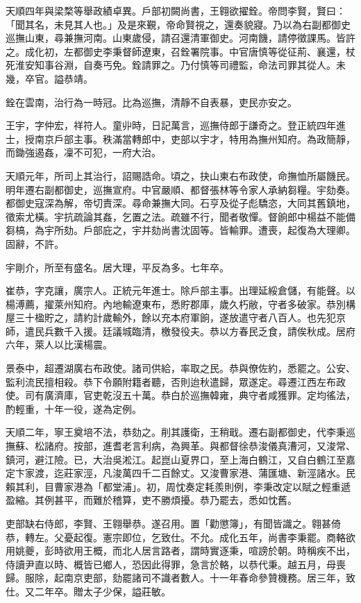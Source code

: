 \begin{pinyinscope}
天順四年與梁楘等舉政績卓異。戶部初闕尚書，王翱欲擢銓。帝問李賢，賢曰：「聞其名，未見其人也。」及是來覲，帝命賢視之，還奏貌寢。乃以為右副都御史巡撫山東，尋兼撫河南。山東歲侵，請召還清軍御史。河南饑，請停徵課馬。皆許之。成化初，左都御史李秉督師遼東，召銓署院事。中官唐慎等從征荊、襄還，杖死淮安知事谷淵，自奏丐免。銓請罪之。乃付慎等司禮監，命法司罪其從人。未幾，卒官。謚恭靖。

銓在雲南，治行為一時冠。比為巡撫，清靜不自表暴，吏民亦安之。

王宇，字仲宏，祥符人。童丱時，日記萬言，巡撫侍郎于謙奇之。登正統四年進士，授南京戶部主事。秩滿當轉郎中，吏部以宇才，特用為撫州知府。為政簡靜，而鋤強遏姦，凜不可犯，一府大治。

天順元年，所司上其治行，詔賜誥命。頃之，抉山東右布政使，命撫恤所屬饑民。明年遷右副都御史，巡撫宣府。中官嚴順、都督張林等令家人承納芻糧。宇劾奏。都御史寇深為解，帝切責深。尋命兼撫大同。石亨及從子彪驕恣，大同其舊鎮地，徵索尤橫。宇抗疏論其姦，乞置之法。疏雖不行，聞者敬憚。督餉郎中楊益不能備芻槁，為宇所劾。戶部庇之，宇并劾尚書沈固等。皆輸罪。遭喪，起復為大理卿。固辭，不許。

宇剛介，所至有盛名。居大理，平反為多。七年卒。

崔恭，字克讓，廣宗人。正統元年進士。除戶部主事。出理延綏倉儲，有能聲。以楊溥薦，擢萊州知府。內地輸遼東布，悉貯郡庫，歲久朽敝，守者多破家。恭別構屋三十楹貯之，請約計歲輸外，餘以充本府軍餉，遂放遣守者八百人。也先犯京師，遣民兵數千入援。廷議城臨清，檄發役夫。恭以方春民乏食，請俟秋成。居府六年，萊人以比漢楊震。

景泰中，超遷湖廣右布政使。諸司供給，率取之民。恭與僚佐約，悉罷之。公安、監利流民擅相殺。恭下令願附籍者聽，否則迨秋遣歸，眾遂定。尋遷江西左布政使。司有廣濟庫，官吏乾沒五十萬。恭白於巡撫韓雍，典守者咸獲罪。定均徭法，酌輕重，十年一役，遂為定例。

天順二年，寧王奠培不法，恭劾之。削其護衛，王稍戢。遷右副都御史，代李秉巡撫蘇、松諸府。按部，進耆老言利病，為興革。與都督徐恭浚儀真漕河，又浚常、鎮河，避江險。已，大治吳淞江。起崑山夏界口，至上海白鶴江，又自白鶴江至嘉定卞家渡，迄莊家涇，凡浚萬四千二百餘丈。又浚曹家港、蒲匯塘、新涇諸水。民賴其利，目曹家港為「都堂浦」。初，周忱奏定耗羨則例，李秉改定以賦之輕重遞盈縮。其例甚平，而難於稽算，吏不勝煩擾。恭乃罷去，悉如忱舊。

吏部缺右侍郎，李賢、王翱舉恭。遂召用。置「勸懲簿」，有聞皆識之。翱甚倚恭，轉左。父憂起復。憲宗即位，乞致仕。不允。成化五年，尚書李秉罷。商輅欲用姚夔，彭時欲用王概，而北人居言路者，謂時實逐秉，喧謗於朝。時稱疾不出，侍讀尹直以時、概皆已鄉人，恐因此得罪，急言於輅，以恭代秉。越五月，母喪歸。服除，起南京吏部，劾罷諸司不識者數人。十一年春命參贊機務。居三年，致仕。又二年卒。贈太子少保，謚莊敏。


\end{pinyinscope}
